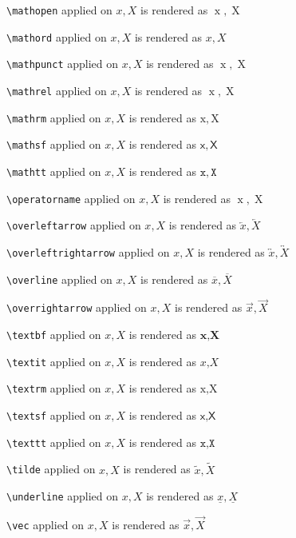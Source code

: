 \texttt{\textbackslash mathopen} applied on $x,X$ is rendered as $\mathopen{x},\mathopen{X}$


\texttt{\textbackslash mathord} applied on $x,X$ is rendered as $\mathord{x},\mathord{X}$


\texttt{\textbackslash mathpunct} applied on $x,X$ is rendered as $\mathpunct{x},\mathpunct{X}$


\texttt{\textbackslash mathrel} applied on $x,X$ is rendered as $\mathrel{x},\mathrel{X}$


\texttt{\textbackslash mathrm} applied on $x,X$ is rendered as $\mathrm{x},\mathrm{X}$


\texttt{\textbackslash mathsf} applied on $x,X$ is rendered as $\mathsf{x},\mathsf{X}$


\texttt{\textbackslash mathtt} applied on $x,X$ is rendered as $\mathtt{x},\mathtt{X}$


\texttt{\textbackslash operatorname} applied on $x,X$ is rendered as $\operatorname{x},\operatorname{X}$


\texttt{\textbackslash overleftarrow} applied on $x,X$ is rendered as $\overleftarrow{x},\overleftarrow{X}$


\texttt{\textbackslash overleftrightarrow} applied on $x,X$ is rendered as $\overleftrightarrow{x},\overleftrightarrow{X}$


\texttt{\textbackslash overline} applied on $x,X$ is rendered as $\overline{x},\overline{X}$


\texttt{\textbackslash overrightarrow} applied on $x,X$ is rendered as $\overrightarrow{x},\overrightarrow{X}$


\texttt{\textbackslash textbf} applied on $x,X$ is rendered as $\textbf{x},\textbf{X}$


\texttt{\textbackslash textit} applied on $x,X$ is rendered as $\textit{x},\textit{X}$


\texttt{\textbackslash textrm} applied on $x,X$ is rendered as $\textrm{x},\textrm{X}$


\texttt{\textbackslash textsf} applied on $x,X$ is rendered as $\textsf{x},\textsf{X}$


\texttt{\textbackslash texttt} applied on $x,X$ is rendered as $\texttt{x},\texttt{X}$


\texttt{\textbackslash tilde} applied on $x,X$ is rendered as $\tilde{x},\tilde{X}$


\texttt{\textbackslash underline} applied on $x,X$ is rendered as $\underline{x},\underline{X}$


\texttt{\textbackslash vec} applied on $x,X$ is rendered as $\vec{x},\vec{X}$


